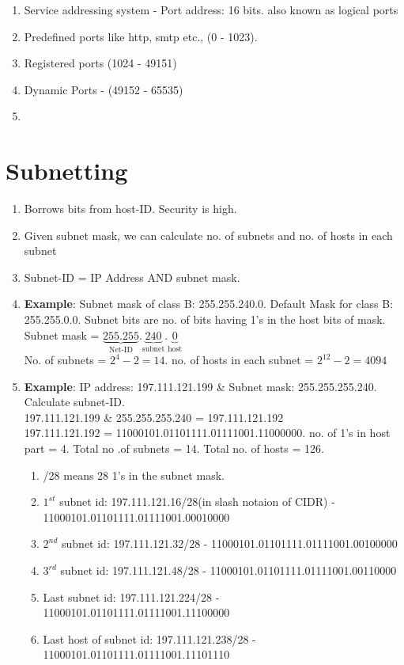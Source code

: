 \documentclass[a4paper,oneside]{book}
\begin{document}
\begin{enumerate}
\item Service addressing system - Port address: 16 bits. also known as logical ports
\item Predefined ports like http, smtp etc., (0 - 1023).
\item Registered ports (1024 - 49151)
\item Dynamic Ports - (49152 - 65535)
\item {}
\end{enumerate}
\section{Subnetting}
\begin{enumerate}
\item Borrows bits from host-ID. Security is high.
\item Given subnet mask, we can calculate no. of subnets and  no. of hosts in each subnet
\item Subnet-ID = IP Address AND subnet mask.
\item \textbf{Example}: Subnet mask of class B: 255.255.240.0. Default Mask for class B: 255.255.0.0. Subnet bits are no. of bits having 1's in the host bits of mask. \\
Subnet mask = $\underbrace{255.255}_\text{Net-ID}.\underbrace{240}_\text{subnet}.\underbrace{0}_\text{host}$\\
No. of subnets = $2^4 - 2 = 14$. no. of hosts in each subnet = $2^{12} - 2 = 4094$
\item \textbf{Example}: IP address: 197.111.121.199 \& Subnet mask: 255.255.255.240. Calculate subnet-ID.\\
197.111.121.199 \& 255.255.255.240 = 197.111.121.192\\
197.111.121.192 = 11000101.01101111.01111001.11000000. no. of 1's in host part = 4. Total no .of subnets = 14. Total no. of hosts = 126.
\begin{enumerate}
\item /28 means 28 1's in the subnet mask.
\item $1^{st}$ subnet id: 197.111.121.16/28(in slash notaion of CIDR) - 11000101.01101111.01111001.00010000
\item $2^{nd}$ subnet id: 197.111.121.32/28 - 11000101.01101111.01111001.00100000
\item $3^{rd}$ subnet id: 197.111.121.48/28 - 11000101.01101111.01111001.00110000
\item Last subnet id: 197.111.121.224/28 - 11000101.01101111.01111001.11100000
\item Last host of subnet id: 197.111.121.238/28 - 11000101.01101111.01111001.11101110
\end{enumerate}
\end{enumerate}
\end{document}
